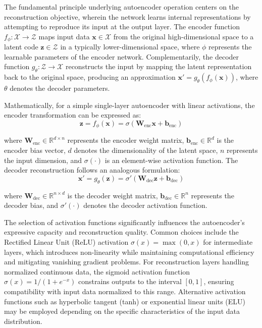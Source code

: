 \documentclass[12pt,a4paper]{report}
\begin{document}
The fundamental principle underlying autoencoder operation centers on the reconstruction objective, wherein the network learns internal representations by attempting to reproduce its input at the output layer. The encoder function $f_\phi: \mathcal{X} \rightarrow \mathcal{Z}$ maps input data $\mathbf{x} \in \mathcal{X}$ from the original high-dimensional space to a latent code $\mathbf{z} \in \mathcal{Z}$ in a typically lower-dimensional space, where $\phi$ represents the learnable parameters of the encoder network. Complementarily, the decoder function $g_\theta: \mathcal{Z} \rightarrow \mathcal{X}$ reconstructs the input by mapping the latent representation back to the original space, producing an approximation $\mathbf{x}' = g_\theta(f_\phi(\mathbf{x}))$, where $\theta$ denotes the decoder parameters.

Mathematically, for a simple single-layer autoencoder with linear activations, the encoder transformation can be expressed as:
\begin{equation}
\mathbf{z} = f_\phi(\mathbf{x}) = \sigma(\mathbf{W}_{\text{enc}} \mathbf{x} + \mathbf{b}_{\text{enc}})
\end{equation}

where $\mathbf{W}_{\text{enc}} \in \mathbb{R}^{d \times n}$ represents the encoder weight matrix, $\mathbf{b}_{\text{enc}} \in \mathbb{R}^{d}$ is the encoder bias vector, $d$ denotes the dimensionality of the latent space, $n$ represents the input dimension, and $\sigma(\cdot)$ is an element-wise activation function. The decoder reconstruction follows an analogous formulation:
\begin{equation}
\mathbf{x}' = g_\theta(\mathbf{z}) = \sigma'(\mathbf{W}_{\text{dec}} \mathbf{z} + \mathbf{b}_{\text{dec}})
\end{equation}

where $\mathbf{W}_{\text{dec}} \in \mathbb{R}^{n \times d}$ is the decoder weight matrix, $\mathbf{b}_{\text{dec}} \in \mathbb{R}^{n}$ represents the decoder bias, and $\sigma'(\cdot)$ denotes the decoder activation function.

The selection of activation functions significantly influences the autoencoder's expressive capacity and reconstruction quality. Common choices include the Rectified Linear Unit (ReLU) activation $\sigma(x) = \max(0, x)$ for intermediate layers, which introduces non-linearity while maintaining computational efficiency and mitigating vanishing gradient problems. For reconstruction layers handling normalized continuous data, the sigmoid activation function $\sigma(x) = 1/(1 + e^{-x})$ constrains outputs to the interval $[0,1]$, ensuring compatibility with input data normalized to this range. Alternative activation functions such as hyperbolic tangent (tanh) or exponential linear units (ELU) may be employed depending on the specific characteristics of the input data distribution.
\end{document}

